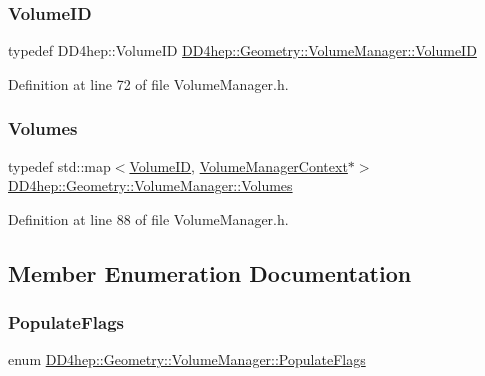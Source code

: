 \subsubsection{\texorpdfstring{Volume\+ID}{VolumeID}}
{\footnotesize\ttfamily typedef D\+D4hep\+::\+Volume\+ID \hyperlink{class_d_d4hep_1_1_geometry_1_1_volume_manager_ab1f746b561c93be38bc7c6e66fc8ca8a}{D\+D4hep\+::\+Geometry\+::\+Volume\+Manager\+::\+Volume\+ID}}



Definition at line 72 of file Volume\+Manager.\+h.

\hypertarget{class_d_d4hep_1_1_geometry_1_1_volume_manager_a81625fd63b37636f0b4019b102aba787}{}\label{class_d_d4hep_1_1_geometry_1_1_volume_manager_a81625fd63b37636f0b4019b102aba787} 
\subsubsection{\texorpdfstring{Volumes}{Volumes}}
{\footnotesize\ttfamily typedef std\+::map$<$\hyperlink{class_d_d4hep_1_1_geometry_1_1_volume_manager_ab1f746b561c93be38bc7c6e66fc8ca8a}{Volume\+ID}, \hyperlink{class_d_d4hep_1_1_geometry_1_1_volume_manager_context}{Volume\+Manager\+Context}$\ast$$>$ \hyperlink{class_d_d4hep_1_1_geometry_1_1_volume_manager_a81625fd63b37636f0b4019b102aba787}{D\+D4hep\+::\+Geometry\+::\+Volume\+Manager\+::\+Volumes}}



Definition at line 88 of file Volume\+Manager.\+h.



\subsection{Member Enumeration Documentation}
\hypertarget{class_d_d4hep_1_1_geometry_1_1_volume_manager_a1c25b37c1377654bf2fbe1cf4743ebde}{}\label{class_d_d4hep_1_1_geometry_1_1_volume_manager_a1c25b37c1377654bf2fbe1cf4743ebde} 
\subsubsection{\texorpdfstring{Populate\+Flags}{PopulateFlags}}
{\footnotesize\ttfamily enum \hyperlink{class_d_d4hep_1_1_geometry_1_1_volume_manager_a1c25b37c1377654bf2fbe1cf4743ebde}{D\+D4hep\+::\+Geometry\+::\+Volume\+Manager\+::\+Populate\+Flags}}

